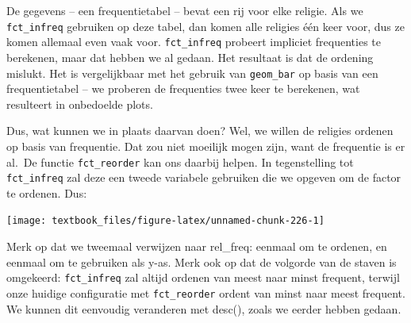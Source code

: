 \documentclass[]{tufte-book}
\newenvironment{Shaded}{}{}
\newcommand{\DataTypeTok}[1]{\textcolor[rgb]{0.56,0.13,0.00}{#1}}
\newcommand{\KeywordTok}[1]{\textcolor[rgb]{0.00,0.44,0.13}{\textbf{#1}}}
\newcommand{\NormalTok}[1]{#1}
\newcommand{\OperatorTok}[1]{\textcolor[rgb]{0.40,0.40,0.40}{#1}}
\newcommand{\StringTok}[1]{\textcolor[rgb]{0.25,0.44,0.63}{#1}}
\begin{document}
De gegevens -- een frequentietabel -- bevat een rij voor elke religie. Als we \texttt{fct\_infreq} gebruiken op deze tabel, dan komen alle religies één keer voor, dus ze komen allemaal even vaak voor. \texttt{fct\_infreq} probeert impliciet frequenties te berekenen, maar dat hebben we al gedaan. Het resultaat is dat de ordening mislukt. Het is vergelijkbaar met het gebruik van \texttt{geom\_bar} op basis van een frequentietabel -- we proberen de frequenties twee keer te berekenen, wat resulteert in onbedoelde plots.

Dus, wat kunnen we in plaats daarvan doen? Wel, we willen de religies ordenen op basis van frequentie. Dat zou niet moeilijk mogen zijn, want de frequentie is er al.~De functie \texttt{fct\_reorder} kan ons daarbij helpen. In tegenstelling tot \texttt{fct\_infreq} zal deze een tweede variabele gebruiken die we opgeven om de factor te ordenen. Dus:

\begin{Shaded}
\end{Shaded}

\texttt{[image: textbook\_files/figure-latex/unnamed-chunk-226-1]}

Merk op dat we tweemaal verwijzen naar rel\_freq: eenmaal om te ordenen, en eenmaal om te gebruiken als y-as. Merk ook op dat de volgorde van de staven is omgekeerd: \texttt{fct\_infreq} zal altijd ordenen van meest naar minst frequent, terwijl onze huidige configuratie met \texttt{fct\_reorder} ordent van minst naar meest frequent. We kunnen dit eenvoudig veranderen met desc(), zoals we eerder hebben gedaan.
\end{document}
